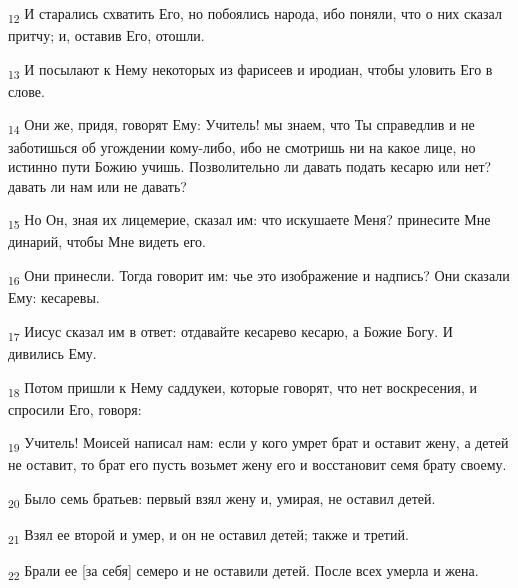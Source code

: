 \begin{tcolorbox}
\textsubscript{12} И старались схватить Его, но побоялись народа, ибо поняли, что о них сказал притчу; и, оставив Его, отошли.
\end{tcolorbox}
\begin{tcolorbox}
\textsubscript{13} И посылают к Нему некоторых из фарисеев и иродиан, чтобы уловить Его в слове.
\end{tcolorbox}
\begin{tcolorbox}
\textsubscript{14} Они же, придя, говорят Ему: Учитель! мы знаем, что Ты справедлив и не заботишься об угождении кому-либо, ибо не смотришь ни на какое лице, но истинно пути Божию учишь. Позволительно ли давать подать кесарю или нет? давать ли нам или не давать?
\end{tcolorbox}
\begin{tcolorbox}
\textsubscript{15} Но Он, зная их лицемерие, сказал им: что искушаете Меня? принесите Мне динарий, чтобы Мне видеть его.
\end{tcolorbox}
\begin{tcolorbox}
\textsubscript{16} Они принесли. Тогда говорит им: чье это изображение и надпись? Они сказали Ему: кесаревы.
\end{tcolorbox}
\begin{tcolorbox}
\textsubscript{17} Иисус сказал им в ответ: отдавайте кесарево кесарю, а Божие Богу. И дивились Ему.
\end{tcolorbox}
\begin{tcolorbox}
\textsubscript{18} Потом пришли к Нему саддукеи, которые говорят, что нет воскресения, и спросили Его, говоря:
\end{tcolorbox}
\begin{tcolorbox}
\textsubscript{19} Учитель! Моисей написал нам: если у кого умрет брат и оставит жену, а детей не оставит, то брат его пусть возьмет жену его и восстановит семя брату своему.
\end{tcolorbox}
\begin{tcolorbox}
\textsubscript{20} Было семь братьев: первый взял жену и, умирая, не оставил детей.
\end{tcolorbox}
\begin{tcolorbox}
\textsubscript{21} Взял ее второй и умер, и он не оставил детей; также и третий.
\end{tcolorbox}
\begin{tcolorbox}
\textsubscript{22} Брали ее [за себя] семеро и не оставили детей. После всех умерла и жена.
\end{tcolorbox}
